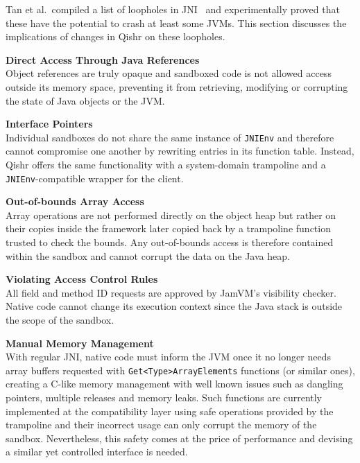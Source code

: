 \documentclass[a4paper,12pt,twoside,openright]{report}
\begin{document}
Tan et al.\ compiled a list of loopholes in JNI~\cite{Tan06safejava} and experimentally proved that these have the potential to crash at least some JVMs. This section discusses the implications of changes in Qishr on these loopholes.

\begin{description}
\item{\bf Direct Access Through Java References} \\
Object references are truly opaque and sandboxed code is not allowed access outside its memory space, preventing it from retrieving, modifying or corrupting the state of Java objects or the JVM.

\item{\bf Interface Pointers} \\
Individual sandboxes do not share the same instance of \texttt{JNIEnv} and therefore cannot compromise one another by rewriting entries in its function table. Instead, Qishr offers the same functionality with a system-domain trampoline and a \texttt{JNIEnv}-compatible wrapper for the client.

\item{\bf Out-of-bounds Array Access} \\
Array operations are not performed directly on the object heap but rather on their copies inside the framework later copied back by a trampoline function trusted to check the bounds. Any out-of-bounds access is therefore contained within the sandbox and cannot corrupt the data on the Java heap.

\item{\bf Violating Access Control Rules} \\
All field and method ID requests are approved by JamVM's visibility checker. Native code cannot change its execution context since the Java stack is outside the scope of the sandbox.

\item{\bf Manual Memory Management} \\
With regular JNI, native code must inform the JVM once it no longer needs array buffers requested with \texttt{Get\-<Type>\-Array\-Elements} functions (or similar ones), creating a C-like memory management with well known issues such as dangling pointers, multiple releases and memory leaks. Such functions are currently implemented at the compatibility layer using safe operations provided by the trampoline and their incorrect usage can only corrupt the memory of the sandbox. Nevertheless, this safety comes at the price of performance and devising a similar yet controlled interface is needed.


\end{description}
\end{document}
